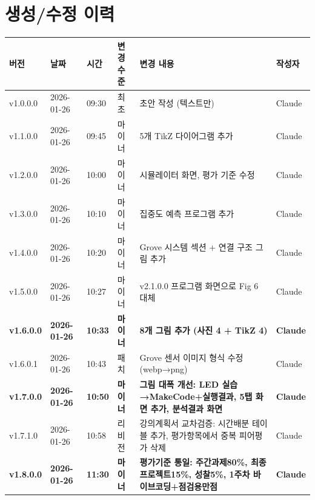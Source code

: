 \documentclass[11pt, a4paper]{article}
\begin{document}
\section*{생성/수정 이력}

\begin{table}[H]
\centering
\small
\begin{tabularx}{\textwidth}{l l l l X l}
\toprule
\textbf{버전} & \textbf{날짜} & \textbf{시간} & \textbf{변경 수준} & \textbf{변경 내용} & \textbf{작성자} \\
\midrule
v1.0.0.0 & 2026-01-26 & 09:30 & 최초 & 초안 작성 (텍스트만) & Claude \\
v1.1.0.0 & 2026-01-26 & 09:45 & 마이너 & 5개 TikZ 다이어그램 추가 & Claude \\
v1.2.0.0 & 2026-01-26 & 10:00 & 마이너 & 시뮬레이터 화면, 평가 기준 수정 & Claude \\
v1.3.0.0 & 2026-01-26 & 10:10 & 마이너 & 집중도 예측 프로그램 추가 & Claude \\
v1.4.0.0 & 2026-01-26 & 10:20 & 마이너 & Grove 시스템 섹션 + 연결 구조 그림 추가 & Claude \\
v1.5.0.0 & 2026-01-26 & 10:27 & 마이너 & v2.1.0.0 프로그램 화면으로 Fig 6 대체 & Claude \\
\textbf{v1.6.0.0} & \textbf{2026-01-26} & \textbf{10:33} & \textbf{마이너} & \textbf{8개 그림 추가 (사진 4 + TikZ 4)} & \textbf{Claude} \\
v1.6.0.1 & 2026-01-26 & 10:43 & 패치 & Grove 센서 이미지 형식 수정 (webp→png) & Claude \\
\textbf{v1.7.0.0} & \textbf{2026-01-26} & \textbf{10:50} & \textbf{마이너} & \textbf{그림 대폭 개선: LED 실습→MakeCode+실행결과, 5탭 화면 추가, 분석결과 화면} & \textbf{Claude} \\
v1.7.1.0 & 2026-01-26 & 10:58 & 리비전 & 강의계획서 교차검증: 시간배분 테이블 추가, 평가항목에서 중복 피어평가 삭제 & Claude \\
\textbf{v1.8.0.0} & \textbf{2026-01-26} & \textbf{11:30} & \textbf{마이너} & \textbf{평가기준 통일: 주간과제80\%, 최종프로젝트15\%, 성찰5\%, 1주차 바이브코딩+점검용만점} & \textbf{Claude} \\
\bottomrule
\end{tabularx}
\end{table}
\end{document}
